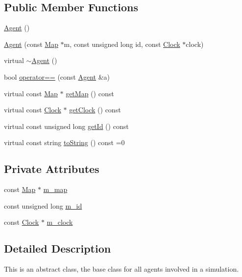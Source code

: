 \subsection*{Public Member Functions}
\begin{DoxyCompactItemize}
\item 
\hyperlink{class_agent_a24a60f1d260bf19a4f7f8a5f36881d3f}{Agent} ()
\item 
\hyperlink{class_agent_a0ad923f2f9966b65a5d908cb9da4217c}{Agent} (const \hyperlink{class_map}{Map} $\ast$m, const unsigned long id, const \hyperlink{class_clock}{Clock} $\ast$clock)
\item 
virtual \hyperlink{class_agent_a4feb26df1cf81760a0e411e393c24d4e}{$\sim$\+Agent} ()
\item 
bool \hyperlink{class_agent_afa2b3a408bb0694aea46fb2bb59bacf7}{operator==} (const \hyperlink{class_agent}{Agent} \&a)
\item 
virtual const \hyperlink{class_map}{Map} $\ast$ \hyperlink{class_agent_a3b60b2f0a0f41ce1f14c39a33cffcc4d}{get\+Map} () const
\item 
virtual const \hyperlink{class_clock}{Clock} $\ast$ \hyperlink{class_agent_ae872060d974c4a5aec875680db38cc68}{get\+Clock} () const
\item 
virtual const unsigned long \hyperlink{class_agent_aa5267ab07bb62f1ed3dfddca286b6ef6}{get\+Id} () const
\item 
virtual const string \hyperlink{class_agent_a44f291596d10c7878b0641d6ec156328}{to\+String} () const =0
\end{DoxyCompactItemize}
\subsection*{Private Attributes}
\begin{DoxyCompactItemize}
\item 
const \hyperlink{class_map}{Map} $\ast$ \hyperlink{class_agent_ab24d62bbfc22946d0c72221c8a43f04a}{m\+\_\+map}
\item 
const unsigned long \hyperlink{class_agent_ad1f52e164c2a829ef4418940567d6e37}{m\+\_\+id}
\item 
const \hyperlink{class_clock}{Clock} $\ast$ \hyperlink{class_agent_a534f22ebb0573aa1d58d274632e592cf}{m\+\_\+clock}
\end{DoxyCompactItemize}


\subsection{Detailed Description}
This is an abstract class, the base class for all agents involved in a simulation. 

